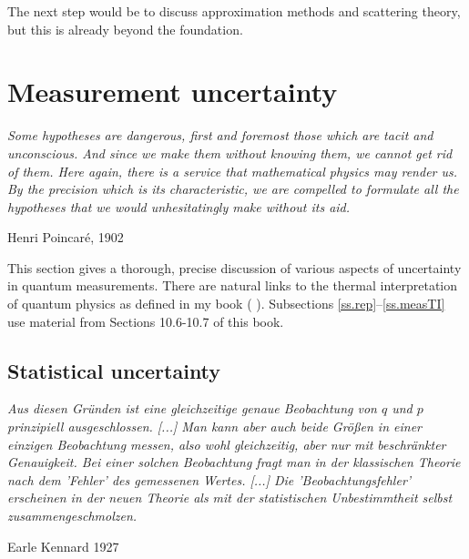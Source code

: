 \documentclass[12pt]{article}
\begin{document}
The next step would be to discuss approximation methods and scattering
theory, but this is already beyond the foundation.











\section{Measurement uncertainty}\label{s.unc}

\nopagebreak
\hfill\parbox[t]{10.8cm}{\footnotesize

{\em Some hypotheses are dangerous, first and foremost those which are
tacit and unconscious. And since we make them without knowing them, we
cannot get rid of them. Here again, there is a service that mathematical
physics may render us. By the precision which is its characteristic, we
are compelled to formulate all the hypotheses that we would
unhesitatingly make without its aid.}

\hfill Henri Poincar\'e, 1902 \cite[p.151]{PoiScH}
}

\bigskip

This section gives a thorough, precise discussion of various aspects of 
uncertainty in quantum measurements. There are natural links to the 
thermal interpretation of quantum physics as defined in my book
( \cite{Neu.CQP}).
Subsections \ref{ss.rep}--\ref{ss.measTI} use material from Sections 
10.6-10.7 of this book.




\subsection{Statistical uncertainty}\label{ss.unc}

\nopagebreak
\hfill\parbox[t]{10.8cm}{\footnotesize

{\em Aus diesen Gr\"unden ist eine gleichzeitige genaue Beobachtung
von $q$ und $p$ prinzipiell ausgeschlossen. [...]
Man kann aber auch beide Gr\"o{\ss}en in einer einzigen Beobachtung
messen, also wohl gleichzeitig, aber nur mit beschr\"ankter Genauigkeit.
Bei einer solchen Beobachtung fragt man in der klassischen Theorie nach
dem 'Fehler' des gemessenen Wertes. [...]
Die 'Beobachtungsfehler' erscheinen in der neuen Theorie als
mit der statistischen Unbestimmtheit selbst zusammengeschmolzen.}

\hfill Earle Kennard 1927 \cite[p.340f]{Ken}
}
\end{document}
